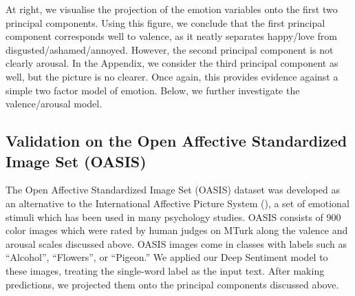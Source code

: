 \documentclass{article} %
\begin{document}
At right, we visualise the projection of the emotion variables onto the first two principal components. Using this figure, we conclude that the first principal component corresponds well to valence, as it neatly separates happy/love from disgusted/ashamed/annoyed. However, the second principal component is not clearly arousal. In the Appendix, we consider the third principal component as well, but the picture is no clearer. Once again, this provides evidence against a simple two factor model of emotion. Below, we further investigate the valence/arousal model.

\subsection{Validation on the Open Affective Standardized Image Set (OASIS)}
The Open Affective Standardized Image Set (OASIS) dataset \citep{kurdi2017introducing} was developed as an alternative to the  International Affective Picture System (\citep{lang2005international}), a set of emotional stimuli which has been used in many psychology studies. OASIS consists of 900 color images which were rated by human judges on MTurk along the valence and arousal scales discussed above. OASIS images come in classes with labels such as ``Alcohol'', ``Flowers'', or ``Pigeon.'' We applied our Deep Sentiment model to these images, treating the single-word label as the input text. After making predictions, we projected them onto the principal components discussed above. 
\end{document}
